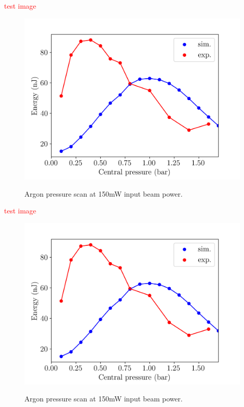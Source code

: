 \documentclass[a4paper]{jpconf}
\begin{document}
\textcolor{red}{test image}
\begin{center}
\begin{figure}
\includegraphics[scale=0.5]{im/energies}\label{im:pressure_scan}
\caption{Argon pressure scan at 150mW input beam power.}
\end{figure}
\end{center}

\textcolor{red}{test image}
\begin{center}
\begin{figure}[h]
\includegraphics[scale=0.5]{im/energies}\label{im:pressure_scan}
\caption{Argon pressure scan at 150mW input beam power.}
\end{figure}
\end{center}
\end{document}
